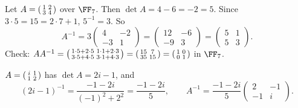 \documentclass[10pt]{scrartcl}
\begin{document}
\begin{example*}
  Let $A=\begin{psmallmatrix}1&2\\3&4\end{psmallmatrix}$ over $\FF_7$. Then $\det A=4-6=-2=5$. Since $3\cdot5=15=2\cdot7+1$, $5^{-1}=3$. So
  \[
    A^{-1}=3\begin{pmatrix}4&-2\\-3&1\end{pmatrix}=\begin{pmatrix}12&-6\\-9&3\end{pmatrix}=\begin{pmatrix}5&1\\5&3\end{pmatrix}.
  \]
  Check: $AA^{-1}=\begin{psmallmatrix}1\cdot5+2\cdot5&1\cdot1+2\cdot3\\3\cdot5+4\cdot5&3\cdot1+4\cdot3\end{psmallmatrix}=\begin{psmallmatrix}15&7\\35&15\end{psmallmatrix}=\begin{psmallmatrix}1&0\\0&1\end{psmallmatrix}$ in $\FF_7$.
\end{example*}

\begin{example*}
  $A=\begin{psmallmatrix}i&1\\1&2\end{psmallmatrix}$ has $\det A=2i-1$, and
  \[
    (2i-1)^{-1}=\frac{-1-2i}{(-1)^2+2^2}=\frac{-1-2i}{5},\qquad A^{-1}=\frac{-1-2i}{5}\begin{pmatrix}2&-1\\-1&i\end{pmatrix}.
  \]
\end{example*}
\end{document}
